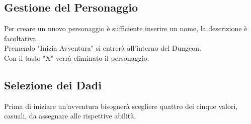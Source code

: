 \documentclass[11pt]{article}
\begin{document}
\subsection{Gestione del Personaggio}
Per creare un nuovo personaggio è sufficiente inserire un nome, la descrizione è facoltativa.\\
Premendo "Inizia Avventura" si entrerà all'interno del Dungeon.\\
Con il tasto "X" verrà eliminato il personaggio.\\
\newline
\begin{center}
\end{center}
\subsection{Selezione dei Dadi}
Prima di iniziare un'avventura bisognerà scegliere quattro dei cinque valori, casuali, da assegnare alle rispettive abilità.\\
\newline
\begin{center}
\end{center}
\end{document}

